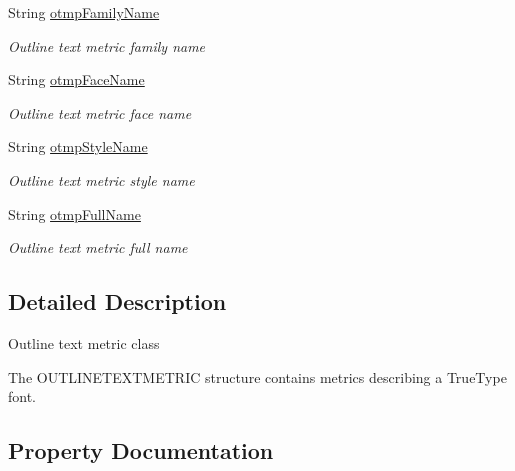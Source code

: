 \begin{DoxyCompactItemize}
String \hyperlink{class_pdf_file_writer_1_1_win_outline_text_metric_a128c2b3f87be49d983371628a9984524}{otmp\+Family\+Name}
\begin{DoxyCompactList}\small\item\em Outline text metric family name \end{DoxyCompactList}\item 
String \hyperlink{class_pdf_file_writer_1_1_win_outline_text_metric_a653e4afb033071f9c01fc74bd95a5e93}{otmp\+Face\+Name}
\begin{DoxyCompactList}\small\item\em Outline text metric face name \end{DoxyCompactList}\item 
String \hyperlink{class_pdf_file_writer_1_1_win_outline_text_metric_a98fcf85a2ce32011eca6459eca702aa8}{otmp\+Style\+Name}
\begin{DoxyCompactList}\small\item\em Outline text metric style name \end{DoxyCompactList}\item 
String \hyperlink{class_pdf_file_writer_1_1_win_outline_text_metric_a5dde87b0c4c11e568f9f69bd38a450d6}{otmp\+Full\+Name}
\begin{DoxyCompactList}\small\item\em Outline text metric full name \end{DoxyCompactList}\end{DoxyCompactItemize}


\subsection{Detailed Description}
Outline text metric class 

The O\+U\+T\+L\+I\+N\+E\+T\+E\+X\+T\+M\+E\+T\+R\+IC structure contains metrics describing a True\+Type font. 

\subsection{Property Documentation}

